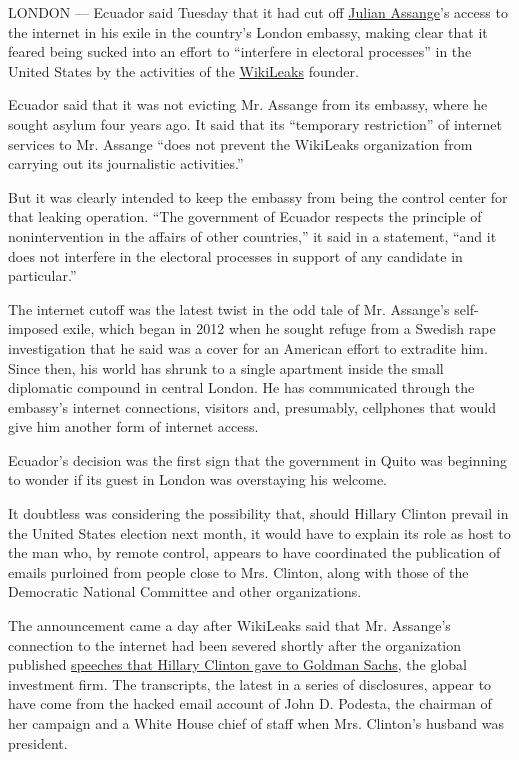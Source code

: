 LONDON --- Ecuador said Tuesday that it had cut off
\href{http://www.nytimes.com/topic/person/julian-assange?8qa}{Julian
Assange}'s access to the internet in his exile in the country's London
embassy, making clear that it feared being sucked into an effort to
``interfere in electoral processes'' in the United States by the
activities of the
\href{http://www.nytimes.com/topic/organization/wikileaks?8qa}{WikiLeaks}
founder.

Ecuador said that it was not evicting Mr. Assange from its embassy,
where he sought asylum four years ago. It said that its ``temporary
restriction'' of internet services to Mr. Assange ``does not prevent the
WikiLeaks organization from carrying out its journalistic activities.''

But it was clearly intended to keep the embassy from being the control
center for that leaking operation. ``The government of Ecuador respects
the principle of nonintervention in the affairs of other countries,'' it
said in a statement, ``and it does not interfere in the electoral
processes in support of any candidate in particular.''

The internet cutoff was the latest twist in the odd tale of Mr.
Assange's self-imposed exile, which began in 2012 when he sought refuge
from a Swedish rape investigation that he said was a cover for an
American effort to extradite him. Since then, his world has shrunk to a
single apartment inside the small diplomatic compound in central London.
He has communicated through the embassy's internet connections, visitors
and, presumably, cellphones that would give him another form of internet
access.

Ecuador's decision was the first sign that the government in Quito was
beginning to wonder if its guest in London was overstaying his welcome.

It doubtless was considering the possibility that, should Hillary
Clinton prevail in the United States election next month, it would have
to explain its role as host to the man who, by remote control, appears
to have coordinated the publication of emails purloined from people
close to Mrs. Clinton, along with those of the Democratic National
Committee and other organizations.

The announcement came a day after WikiLeaks said that Mr. Assange's
connection to the internet had been severed shortly after the
organization published
\href{http://www.nytimes.com/2016/10/16/us/politics/wikileaks-hack-hillary-clinton-emails.html}{speeches
that Hillary Clinton gave to Goldman Sachs}, the global investment firm.
The transcripts, the latest in a series of disclosures, appear to have
come from the hacked email account of John D. Podesta, the chairman of
her campaign and a White House chief of staff when Mrs. Clinton's
husband was president.

